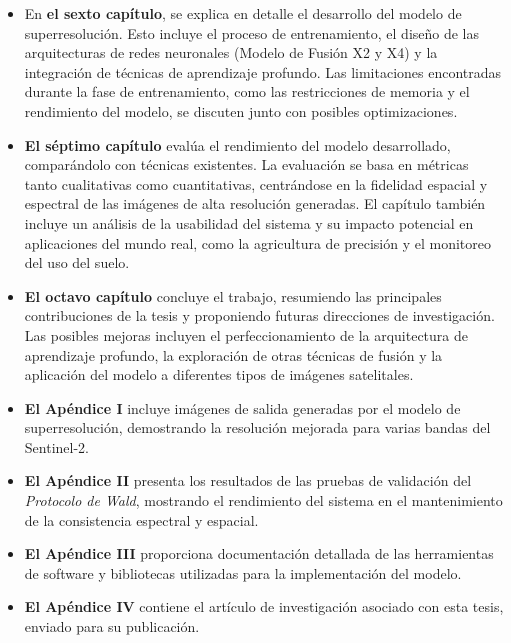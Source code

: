 \begin{itemize}
    \item En \textbf{el sexto capítulo}, se explica en detalle el desarrollo del modelo de superresolución. Esto incluye el proceso de entrenamiento, el diseño de las arquitecturas de redes neuronales (Modelo de Fusión X2 y X4) y la integración de técnicas de aprendizaje profundo. Las limitaciones encontradas durante la fase de entrenamiento, como las restricciones de memoria y el rendimiento del modelo, se discuten junto con posibles optimizaciones.

    \item \textbf{El séptimo capítulo} evalúa el rendimiento del modelo desarrollado, comparándolo con técnicas existentes. La evaluación se basa en métricas tanto cualitativas como cuantitativas, centrándose en la fidelidad espacial y espectral de las imágenes de alta resolución generadas. El capítulo también incluye un análisis de la usabilidad del sistema y su impacto potencial en aplicaciones del mundo real, como la agricultura de precisión y el monitoreo del uso del suelo.

    \item \textbf{El octavo capítulo} concluye el trabajo, resumiendo las principales contribuciones de la tesis y proponiendo futuras direcciones de investigación. Las posibles mejoras incluyen el perfeccionamiento de la arquitectura de aprendizaje profundo, la exploración de otras técnicas de fusión y la aplicación del modelo a diferentes tipos de imágenes satelitales.

    \item \textbf{El Apéndice I} incluye imágenes de salida generadas por el modelo de superresolución, demostrando la resolución mejorada para varias bandas del Sentinel-2.

    \item \textbf{El Apéndice II} presenta los resultados de las pruebas de validación del \textit{Protocolo de Wald}, mostrando el rendimiento del sistema en el mantenimiento de la consistencia espectral y espacial.

    \item \textbf{El Apéndice III} proporciona documentación detallada de las herramientas de software y bibliotecas utilizadas para la implementación del modelo.

    \item \textbf{El Apéndice IV} contiene el artículo de investigación asociado con esta tesis, enviado para su publicación.
\end{itemize}

